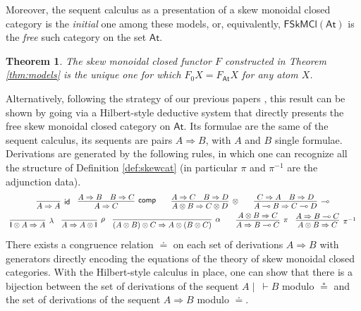 \documentclass[copyright,creativecommons]{eptcs}
\newtheorem{theorem}{Theorem}[section]
\theoremstyle{definition}
\newcommand{\id}{\mathsf{id}}
\newcommand{\ot}{\otimes}
\newcommand{\lolli}{\multimap}
\newcommand{\I}{\mathsf{I}}
\newcommand{\FSkMCC}{\mathsf{FSkMCl}}
\begin{document}
Moreover, the sequent calculus as a presentation of a skew monoidal closed category is the \emph{initial} one among these
models, or, equivalently, $\FSkMCC(\mathsf{At})$ is the \emph{free}
such category on the set $\mathsf{At}$.

\begin{theorem}\label{thm:unique}
  The skew monoidal closed functor $F$ constructed in Theorem \ref{thm:models}
  is the unique one for which $F_0 X = F_{\mathsf{At}} X$ for any atom $X$.
\end{theorem}

Alternatively, following the strategy of our previous papers \cite{uustalu:sequent:2021,uustalu:proof:nodate,uustalu:deductive:nodate,veltri:coherence:2021}, this result can be shown by going via a Hilbert-style deductive system that directly presents the free skew monoidal closed category on $\mathsf{At}$. Its formulae are the same of the sequent calculus, its sequents are pairs $A \Rightarrow B$, with $A$ and $B$ single formulae. Derivations are generated by the following rules, in which one can  recognize all the structure of Definition \ref{def:skewcat} (in particular $\pi$ and $\pi^{-1}$ are the adjunction data).
\begin{displaymath}
  \def\arraystretch{1.5}
  \begin{array}{c}
        \infer[\id]{A \Rightarrow A}{}
        \quad
        \infer[\mathsf{comp}]{A \Rightarrow C}{
          A \Rightarrow B
          &
          B \Rightarrow C
        }
        \qquad
      \infer[\otimes]{A \ot B \Rightarrow C \ot D}{
        A \Rightarrow C
        &
        B \Rightarrow D
      }
      \qquad
      \infer[\lolli]{A \lolli B \Rightarrow C \lolli D}{
        C \Rightarrow A
        &
        B \Rightarrow D
      }
      \\
      \infer[\lambda]{\I \ot A \Rightarrow A}{}
      \quad
      \infer[\rho]{A \Rightarrow A \ot \I}{}
      \quad
      \infer[\alpha]{(A \ot B) \ot C \Rightarrow A \ot (B \ot C)}{}
      \qquad
      \infer[\pi]{A \Rightarrow B \lolli C}{A \ot B \Rightarrow C}
      \quad
      \infer[\pi^{-1}]{A \ot B \Rightarrow C}{A \Rightarrow B \lolli C}
  \end{array}
\end{displaymath}
There exists a congruence relation $\doteq$ on each set of derivations $A \Rightarrow B$ with generators directly encoding the equations of the theory of skew monoidal closed categories. With the Hilbert-style calculus in place, one can show that there is a bijection between the set of derivations of the sequent $A \mid ~ \vdash B$ modulo $\circeq$ and the set of derivations of the sequent $A \Rightarrow B$ modulo $\doteq$.
\end{document}
